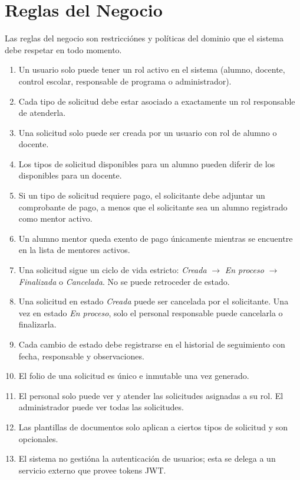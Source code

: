 \section{Reglas del Negocio}

Las reglas del negocio son restricciónes y políticas del dominio que el sistema debe respetar en todo momento.

\begin{enumerate}[label=\textbf{RG-\arabic*:}, leftmargin=2cm]
    \item Un usuario solo puede tener un rol activo en el sistema (alumno, docente, control escolar, responsable de programa o administrador).

    \item Cada tipo de solicitud debe estar asociado a exactamente un rol responsable de atenderla.

    \item Una solicitud solo puede ser creada por un usuario con rol de alumno o docente.

    \item Los tipos de solicitud disponibles para un alumno pueden diferir de los disponibles para un docente.

    \item Si un tipo de solicitud requiere pago, el solicitante debe adjuntar un comprobante de pago, a menos que el solicitante sea un alumno registrado como mentor activo.

    \item Un alumno mentor queda exento de pago únicamente mientras se encuentre en la lista de mentores activos.

    \item Una solicitud sigue un ciclo de vida estricto: \textit{Creada} $\rightarrow$ \textit{En proceso} $\rightarrow$ \textit{Finalizada} o \textit{Cancelada}. No se puede retroceder de estado.

    \item Una solicitud en estado \textit{Creada} puede ser cancelada por el solicitante. Una vez en estado \textit{En proceso}, solo el personal responsable puede cancelarla o finalizarla.

    \item Cada cambio de estado debe registrarse en el historial de seguimiento con fecha, responsable y observaciones.

    \item El folio de una solicitud es único e inmutable una vez generado.

    \item El personal solo puede ver y atender las solicitudes asignadas a su rol. El administrador puede ver todas las solicitudes.

    \item Las plantillas de documentos solo aplican a ciertos tipos de solicitud y son opcionales.

    \item El sistema no gestióna la autenticación de usuarios; esta se delega a un servicio externo que provee tokens JWT.
\end{enumerate}
